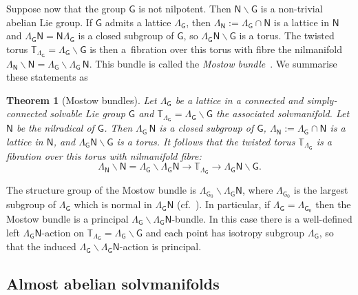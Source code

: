 \documentclass[11pt]{article}
\numberwithin{equation}{section}
\numberwithin{equation}{section}
\newcommand{\sfG}{\mathsf{G}}
\newcommand{\sfN}{\mathsf{N}}
\newcommand{\torus}{{\mathbb T}} %
\newtheorem{Theorem}{Theorem}[section]
\begin{document}
Suppose now that the group $\sfG$ is not nilpotent. Then $\sfN\backslash\sfG$
is a non-trivial abelian Lie group. If $\sfG$ admits a lattice $\Lambda_\sfG$, then
$\Lambda_{\sfN}:=\Lambda_\sfG\cap\sfN$ is a lattice in $\sfN$ and
$\Lambda_\sfG \sfN=\sfN \Lambda_\sfG$ is a closed subgroup of $\sfG$, so
$\Lambda_\sfG \sfN\backslash\sfG$ is a torus. The twisted torus
$\torus_{\Lambda_\sfG}=\Lambda_\sfG\backslash\sfG$ is then a~fibration over this torus with fibre
the nilmanifold $\Lambda_{\sfN}\backslash\sfN=\Lambda_\sfG\backslash \Lambda_\sfG\,\sfN$. This
bundle is called the \emph{Mostow bundle}~\cite{Mostow1954}. We summarise these statements as
\begin{Theorem}[Mostow bundles]
\label{thm:Mostowbundle}
Let ${\Lambda_\sfG}$ be a lattice in a connected and simply-connected
solvable Lie group $\sfG$ and $\torus_{\Lambda_\sfG} =
\Lambda_\sfG\backslash\sfG$ the associated solvmanifold. Let $\sfN$ be the nilradical
 of $\sfG$.
Then $\Lambda_\sfG\,\sfN$ is a closed subgroup of $\sfG$,
$\Lambda_{\sfN}:=\Lambda_\sfG\cap\sfN$ is a lattice in
$\sfN$, and $\Lambda_\sfG \sfN\backslash\sfG$ is a torus.
It follows that the twisted torus
$\torus_{\Lambda_\sfG}$ is a fibration over this torus with
nilmanifold fibre:
\[
\Lambda_{\sfN}\backslash\sfN=\Lambda_\sfG\backslash\Lambda_\sfG \sfN
\longrightarrow
\torus_{\Lambda_\sfG}\longrightarrow \Lambda_\sfG \sfN\backslash\sfG .
\]
\end{Theorem}

\begin{Remark}\label{rem:Mostow}
The structure group of the Mostow bundle is
$\Lambda_{\sfG_0}\backslash\Lambda_\sfG \sfN$, where $\Lambda_{\sfG_0}$ is
the largest subgroup of $\Lambda_{\sfG}$ which is normal in
$\Lambda_\sfG \sfN$ (cf.~\cite{Bock2009}).
In particular, if $\Lambda_{\sfG}=\Lambda_{\sfG_0}$ then the Mostow bundle is
a principal $\Lambda_{\sfG}\backslash\Lambda_\sfG \sfN$-bundle. In
this case there is a well-defined left $\Lambda_\sfG \sfN$-action on $\torus_{\Lambda_\sfG} =
\Lambda_\sfG\backslash\sfG$ and each point has isotropy subgroup ${\Lambda_\sfG}$,
so that the induced $\Lambda_{\sfG}\backslash\Lambda_\sfG \sfN$-action
is principal.
\end{Remark}

\setcounter{Theorem}{4}\setcounter{subsection}{1}\setcounter{equation}{1}
\subsection{Almost abelian solvmanifolds}\label{sec:abeliansolv}
\end{document}
